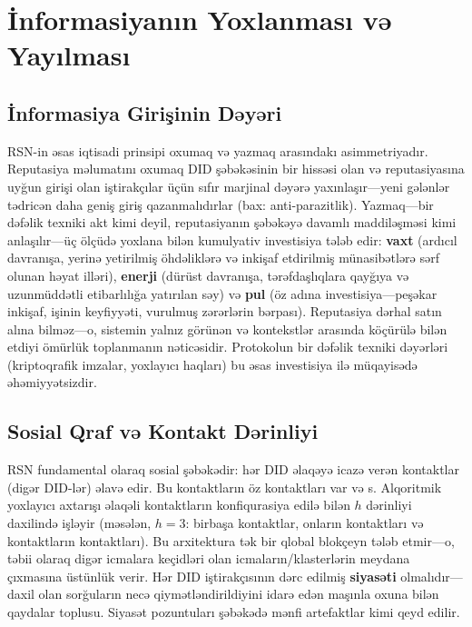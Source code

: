 \documentclass[11pt,a4paper,twocolumn]{article}
\begin{document}
\section{İnformasiyanın Yoxlanması və Yayılması}

\subsection{İnformasiya Girişinin Dəyəri}

RSN-in əsas iqtisadi prinsipi oxumaq və yazmaq arasındakı asimmetriyadır. Reputasiya məlumatını oxumaq DID şəbəkəsinin bir hissəsi olan və reputasiyasına uyğun girişi olan iştirakçılar üçün sıfır marjinal dəyərə yaxınlaşır---yeni gələnlər tədricən daha geniş giriş qazanmalıdırlar (bax: anti-parazitlik). Yazmaq---bir dəfəlik texniki akt kimi deyil, reputasiyanın şəbəkəyə davamlı maddiləşməsi kimi anlaşılır---üç ölçüdə yoxlana bilən kumulyativ investisiya tələb edir: \textbf{vaxt} (ardıcıl davranışa, yerinə yetirilmiş öhdəliklərə və inkişaf etdirilmiş münasibətlərə sərf olunan həyat illəri), \textbf{enerji} (dürüst davranışa, tərəfdaşlıqlara qayğıya və uzunmüddətli etibarlılığa yatırılan səy) və \textbf{pul} (öz adına investisiya---peşəkar inkişaf, işinin keyfiyyəti, vurulmuş zərərlərin bərpası). Reputasiya dərhal satın alına bilməz---o, sistemin yalnız görünən və kontekstlər arasında köçürülə bilən etdiyi ömürlük toplanmanın nəticəsidir. Protokolun bir dəfəlik texniki dəyərləri (kriptoqrafik imzalar, yoxlayıcı haqları) bu əsas investisiya ilə müqayisədə əhəmiyyətsizdir.

\subsection{Sosial Qraf və Kontakt Dərinliyi}

RSN fundamental olaraq sosial şəbəkədir: hər DID əlaqəyə icazə verən kontaktlar (digər DID-lər) əlavə edir. Bu kontaktların öz kontaktları var və s. Alqoritmik yoxlayıcı axtarışı əlaqəli kontaktların konfiqurasiya edilə bilən $h$ dərinliyi daxilində işləyir (məsələn, $h=3$: birbaşa kontaktlar, onların kontaktları və kontaktların kontaktları). Bu arxitektura tək bir qlobal blokçeyn tələb etmir---o, təbii olaraq digər icmalara keçidləri olan icmaların/klasterlərin meydana çıxmasına üstünlük verir. Hər DID iştirakçısının dərc edilmiş \textbf{siyasəti} olmalıdır---daxil olan sorğuların necə qiymətləndirildiyini idarə edən maşınla oxuna bilən qaydalar toplusu. Siyasət pozuntuları şəbəkədə mənfi artefaktlar kimi qeyd edilir.
\end{document}
